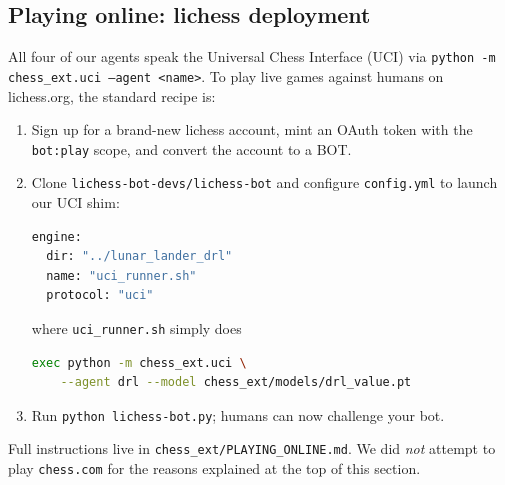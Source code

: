 \documentclass[11pt,a4paper]{article}
\begin{document}
\subsection{Playing online: lichess deployment}
\label{sec:online}

All four of our agents speak the Universal Chess Interface (UCI) via
\texttt{python -m chess\_ext.uci --agent <name>}. To play live games
against humans on lichess.org, the standard recipe is:
\begin{enumerate}
  \item Sign up for a brand-new lichess account, mint an OAuth token
    with the \texttt{bot:play} scope, and convert the account to a BOT.
  \item Clone \texttt{lichess-bot-devs/lichess-bot} \cite{lichessbot}
    and configure \texttt{config.yml} to launch our UCI shim:
\begin{lstlisting}[language=bash]
engine:
  dir: "../lunar_lander_drl"
  name: "uci_runner.sh"
  protocol: "uci"
\end{lstlisting}
    where \texttt{uci\_runner.sh} simply does
\begin{lstlisting}[language=bash]
exec python -m chess_ext.uci \
    --agent drl --model chess_ext/models/drl_value.pt
\end{lstlisting}
  \item Run \texttt{python lichess-bot.py}; humans can now challenge
    your bot.
\end{enumerate}
Full instructions live in \texttt{chess\_ext/PLAYING\_ONLINE.md}.
We did \emph{not} attempt to play \texttt{chess.com} for the reasons
explained at the top of this section.
\end{document}
